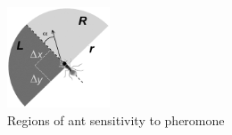 \begin{figure}[h]
    	\includegraphics[height=3cm]{img/l_r_regions}
        \caption{Regions of ant sensitivity to pheromone \cite{perna_individual_2012}}
\end{figure}